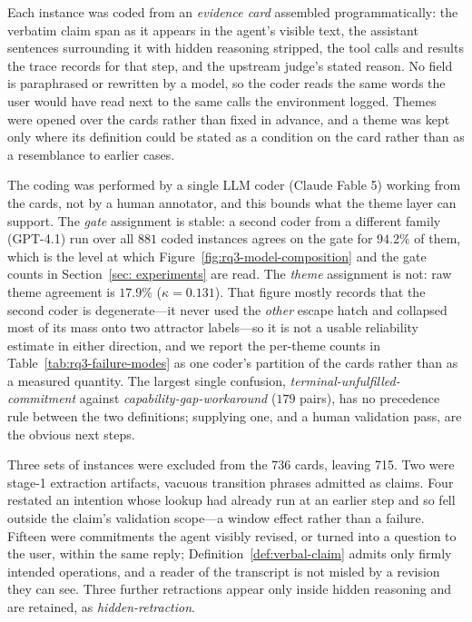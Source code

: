 \documentclass{article} %
\begin{document}
Each instance was coded from an \emph{evidence card} assembled
programmatically: the verbatim claim span as it appears in the agent's visible
text, the assistant sentences surrounding it with hidden reasoning stripped, the
tool calls and results the trace records for that step, and the upstream judge's
stated reason. No field is paraphrased or rewritten by a model, so the coder
reads the same words the user would have read next to the same calls the
environment logged. Themes were opened over the cards rather than fixed in
advance, and a theme was kept only where its definition could be stated as a
condition on the card rather than as a resemblance to earlier cases.

The coding was performed by a single LLM coder (Claude Fable 5) working from
the cards, not by a human annotator, and this bounds what the theme layer can
support. The \emph{gate} assignment is stable: a second coder from a different
family (GPT-4.1) run over all $881$ coded instances agrees on the gate for
$94.2\%$ of them, which is the level at which
Figure~\ref{fig:rq3-model-composition} and the gate counts in
Section~\ref{sec: experiments} are read. The \emph{theme} assignment is
not: raw theme agreement is $17.9\%$ ($\kappa = 0.131$). That figure mostly
records that the second coder is degenerate---it never used the
\emph{other} escape hatch and collapsed most of its mass onto two attractor
labels---so it is not a usable reliability estimate in either direction, and we
report the per-theme counts in Table~\ref{tab:rq3-failure-modes} as one coder's
partition of the cards rather than as a measured quantity. The largest single
confusion, \emph{terminal-unfulfilled-commitment} against
\emph{capability-gap-workaround} ($179$ pairs), has no precedence rule between
the two definitions; supplying one, and a human validation pass, are the
obvious next steps.

Three sets of instances were excluded from the 736 cards, leaving 715. Two were
stage-1 extraction artifacts, vacuous transition phrases admitted as claims.
Four restated an intention whose lookup had already run at an earlier step and
so fell outside the claim's validation scope---a window effect rather than a
failure. Fifteen were commitments the agent visibly revised, or turned into a
question to the user, within the same reply; Definition~\ref{def:verbal-claim}
admits only firmly intended operations, and a reader of the transcript is not
misled by a revision they can see. Three further retractions appear only inside
hidden reasoning and are retained, as \emph{hidden-retraction}.
\end{document}
